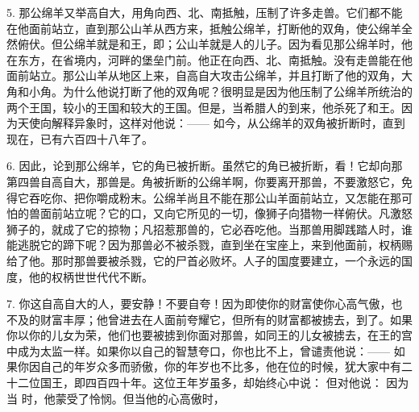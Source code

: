 5. 那公绵羊又举高自大，用角向西、北、南抵触，压制了许多走兽。它们都不能在他面前站立，直到那公山羊从西方来，抵触公绵羊，打断他的双角，使公绵羊全然俯伏。但公绵羊就是和王，即；公山羊就是人的儿子。因为看见那公绵羊时，他在东方，在省境内，河畔的堡垒门前。他正在向西、北、南抵触。没有走兽能在他面前站立。那公山羊从地区上来，自高自大攻击公绵羊，并且打断了他的双角，大角和小角。为什么他说打断了他的双角呢？很明显是因为他压制了公绵羊所统治的两个王国，较小的王国和较大的王国。但是，当希腊人的到来，他杀死了和王。因为天使向解释异象时，这样对他说：——  如今，从公绵羊的双角被折断时，直到现在，已有六百四十八年了。\par

6. 因此，论到那公绵羊，它的角已被折断。虽然它的角已被折断，看！它却向那第四兽自高自大，那兽是。角被折断的公绵羊啊，你要离开那兽，不要激怒它，免得它吞吃你、把你嚼成粉末。公绵羊尚且不能在那公山羊面前站立，又怎能在那可怕的兽面前站立呢？它的口，又向它所见的一切，像狮子向猎物一样俯伏。凡激怒狮子的，就成了它的掠物；凡招惹那兽的，它必吞吃他。当那兽用脚践踏人时，谁能逃脱它的蹄下呢？因为那兽必不被杀戮，直到坐在宝座上，来到他面前，权柄赐给了他。那时那兽要被杀戮，它的尸首必败坏。人子的国度要建立，一个永远的国度，他的权柄世世代代不断。\par

7. 你这自高自大的人，要安静！不要自夸！因为即使你的财富使你心高气傲，也不及的财富丰厚；他曾进去在人面前夸耀它，但所有的财富都被掳去，到了。如果你以你的儿女为荣，他们也要被掳到你面对那兽，如同王的儿女被掳去，在王的宫中成为太监一样。如果你以自己的智慧夸口，你也比不上，曾谴责他说：——  如果你因自己的年岁众多而骄傲，你的年岁也不比多，他在位的时候，犹大家中有二十二位国王，即四百四十年。这位王年岁虽多，却始终心中说： 但对他说： 因为当 时，他蒙受了怜悯。但当他的心高傲时，\par

